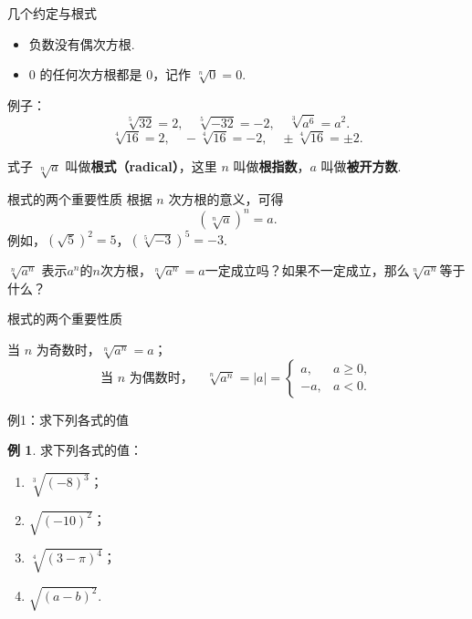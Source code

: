 \documentclass[aspectratio=169,13pt,t,fleqn] {beamer}
\theoremstyle{definition}
\newtheorem{exam}{例}
\begin{document}
\begin{frame}{几个约定与根式}
	\begin{summarybox}[注意]
		\begin{itemize}
			\item 负数没有偶次方根.
			\item \(0\) 的任何次方根都是 \(0\)，记作 \(\sqrt[n]{0}=0\).
		\end{itemize}
	\end{summarybox}
	\vspace{1em}
	\pause
	例子：
	\[
		\sqrt[5]{32}=2,\quad \sqrt[5]{-32}=-2,\quad \sqrt[3]{a^6}=a^2.
	\]
	\[
		\sqrt[4]{16}=2,\quad -\sqrt[4]{16}=-2,\quad \pm\sqrt[4]{16}=\pm 2.
	\]
	\vspace{-1em}
	\pause
	\begin{summarybox-answer}
		式子 \(\sqrt[n]{a}\) 叫做\textbf{根式（radical）}，这里 \(n\) 叫做\textbf{根指数}，\(a\) 叫做\textbf{被开方数}.
	\end{summarybox-answer}
\end{frame}

\begin{frame}{根式的两个重要性质}
	根据 \(n\) 次方根的意义，可得
	\[
		\left(\sqrt[n]{a}\right)^n=a.
	\]
	例如，\((\sqrt{5})^2=5\)，\((\sqrt[5]{-3})^5=-3\).
	\vspace{1em}
	\pause
	\begin{summarybox}[探究：根式开方规律]
	\hspace{2em}\(\sqrt[n]{a^n}\) 表示$a^n$的$n$次方根，$\sqrt[n]{a^n} = a$一定成立吗？如果不一定成立，那么$\sqrt[n]{a^n}$等于什么？	
	\end{summarybox}
\end{frame}


\begin{frame}{根式的两个重要性质}
	
	\begin{summarybox-answer}
		\hspace{2em}当 \(n\) 为奇数时，\(\sqrt[n]{a^n}=a\)；
		\[
		\text{当 } n \text{ 为偶数时，}\quad \sqrt[n]{a^n}=|a|=\begin{cases} a, & a\geqslant 0,\\ -a, & a<0.\end{cases}
		\]
	\end{summarybox-answer}
\end{frame}

\begin{frame}{例1：求下列各式的值}
	\begin{exam}
		求下列各式的值：
		\begin{enumerate}[(1)]
			\item \(\sqrt[3]{(-8)^3}\)；
			\item \(\sqrt{(-10)^2}\)；
			\item \(\sqrt[4]{(3-\pi)^4}\)；
			\item \(\sqrt{(a-b)^2}\).
		\end{enumerate}
	\end{exam}
\end{frame}
\end{document}
